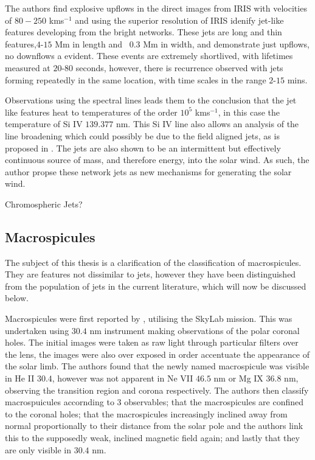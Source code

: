 The authors find explosive upflows in the direct images from IRIS with velocities of $80-250$ kms$^{-1}$ and using the superior resolution of IRIS idenify jet-like features developing from the bright networks.
These jets are long and thin features,$4$-$15$ Mm in length and ~$0.3$ Mm in width, and demonstrate just upflows, no downflows a evident.
These events are extremely shortlived, with lifetimes measured at $20$-$80$ seconds, however, there is recurrence observed with jets forming repeatedly in the same location, with time scales in the range $2$-$15$ mins.

Observations using the spectral lines leads them to the conclusion that the jet like features heat to temperatures of the order $10^5$ kms$^{-1}$, in this case the temperature of Si IV $139.377$ nm.
This Si IV line also allows an analysis of the line broadening which could possibly be due to the field aligned jets, as is proposed in \cite{Archontis2005}.
The jets are also shown to be an intermittent but effectively continuous source of mass, and therefore energy, into the solar wind.
As such, the author propse these network jets as new mechanisms for generating the solar wind.

Chromospheric Jets?




\subsection{Macrospicules}


The subject of this thesis is a clarification of the classification of macrospicules. 
They are features not dissimilar to jets, however they have been distinguished from the population of jets in the current literature, which will now be discussed below.

Macrospicules were first reported by \cite{Bohlin1975}, utilising the SkyLab mission.
This was undertaken using $30.4$ nm instrument making observations of the polar coronal holes.
The initial images were taken as raw light through particular filters over the lens, the images were also over exposed in order accentuate the appearance of the solar limb.
The authors found that the newly named macrospicule was visible in He II $30.4$, however was not apparent in Ne VII $46.5$ nm or Mg IX $36.8$ nm, observing the transition region and corona respectively.
The authors then classify macrospuicules accornding to 3 observables; that the macrospicules are confined to the coronal holes; that the macrospicules increasingly inclined away from normal proportionally to their distance from the solar pole and the authors link this to the supposedly weak, inclined magnetic field again; and lastly that they are only visible in $30.4$ nm.
 

